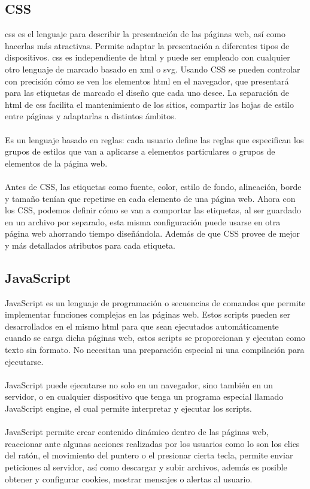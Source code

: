 \documentclass[12pt, a4paper, titlepage]{article}
\begin{document}
	\subsection{CSS}
	\acrfull{css} es el lenguaje para describir la presentación de las páginas web, así como hacerlas más atractivas. Permite adaptar la presentación a diferentes tipos de dispositivos. \acrshort{css} es independiente de \acrshort{html} y puede ser empleado con cualquier otro lenguaje de marcado basado en \acrshort{xml} o \acrshort{svg}. Usando CSS se pueden controlar con precisión cómo se ven los elementos \acrshort{html} en el navegador, que presentará para las etiquetas de marcado el diseño que cada uno desee. La separación de \acrshort{html} de \acrshort{css} facilita el mantenimiento de los sitios, compartir las hojas de estilo entre páginas y adaptarlas a distintos ámbitos. \cite{refcss}\\\\
	Es un lenguaje basado en reglas: cada usuario define las reglas que especifican los grupos de estilos que van a aplicarse a elementos particulares o grupos de elementos de la página web.\\\\
	Antes de CSS, las etiquetas como fuente, color, estilo de fondo, alineación, borde y tamaño tenían que repetirse en cada elemento de una página web. Ahora con los CSS, podemos definir cómo se van a comportar las etiquetas, al ser guardado en un archivo por separado, esta misma configuración puede usarse en otra página web ahorrando tiempo diseñándola. Además de que CSS provee de mejor y más detallados atributos para cada etiqueta.
	\subsection{JavaScript}
	JavaScript es un lenguaje de programación o secuencias de comandos que permite implementar funciones complejas en las páginas web. Estos scripts pueden ser desarrollados en el mismo \acrshort{html} para que sean ejecutados automáticamente cuando se carga dicha páginas web, estos scripts se proporcionan y ejecutan como texto sin formato. No necesitan una preparación especial ni una compilación para ejecutarse. \cite{refjs}\\\\
	JavaScript puede ejecutarse no solo en un navegador, sino también en un servidor, o en cualquier dispositivo que tenga un programa especial llamado JavaScript engine, el cual permite interpretar y ejecutar los scripts.\\\\
	JavaScript permite crear contenido dinámico dentro de las páginas web, reaccionar ante algunas acciones realizadas por los usuarios como lo son los clics del ratón, el movimiento del puntero o el presionar cierta tecla, permite enviar peticiones al servidor, así como descargar y subir archivos, además es posible obtener y configurar cookies, mostrar mensajes o alertas al usuario.
\end{document}
